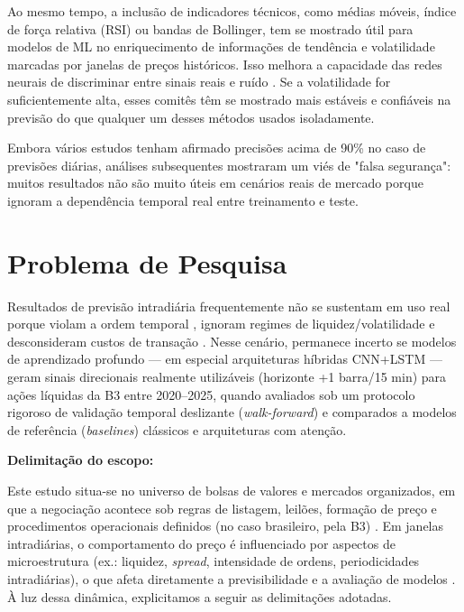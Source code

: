 Ao mesmo tempo, a inclusão de indicadores técnicos, como médias móveis, índice de força relativa (RSI) ou bandas de Bollinger, tem se mostrado útil para modelos de ML no enriquecimento de informações de tendência e volatilidade marcadas por janelas de preços históricos. Isso melhora a capacidade das redes neurais de discriminar entre sinais reais e ruído \cite{ding2020}. Se a volatilidade for suficientemente alta, esses comitês têm se mostrado mais estáveis e confiáveis na previsão do que qualquer um desses métodos usados isoladamente.

Embora vários estudos tenham afirmado precisões acima de 90\% no caso de previsões diárias, análises subsequentes mostraram um viés de "falsa segurança": muitos resultados não são muito úteis em cenários reais de mercado porque ignoram a dependência temporal real entre treinamento e teste.


\section{Problema de Pesquisa}

Resultados de previsão intradiária frequentemente não se sustentam em uso real porque violam a ordem temporal \cite{bergmeir2012,lopezdeprado2018}, ignoram regimes de liquidez/volatilidade \cite{hasbrouck2007empirical,andersen1997intraday,amihud2002illiquidity} e desconsideram custos de transação \cite{lopezdeprado2018,sharpe1994}. Nesse cenário, permanece incerto se modelos de aprendizado profundo — em especial arquiteturas híbridas CNN+LSTM — geram sinais direcionais realmente utilizáveis (horizonte +1 barra/15 min) para ações líquidas da B3 entre 2020–2025, quando avaliados sob um protocolo rigoroso de validação temporal deslizante (\textit{walk-forward}) e comparados a modelos de referência (\textit{baselines}) clássicos e arquiteturas com atenção.

\textbf{Delimitação do escopo:}

Este estudo situa-se no universo de bolsas de valores e mercados organizados, em que a negociação acontece sob regras de listagem, leilões, formação de preço e procedimentos operacionais definidos (no caso brasileiro, pela B3) \cite{b3_manual_negociacao}. Em janelas intradiárias, o comportamento do preço é influenciado por aspectos de microestrutura (ex.: liquidez, \textit{spread}, intensidade de ordens, periodicidades intradiárias), o que afeta diretamente a previsibilidade e a avaliação de modelos \cite{hasbrouck2007empirical,andersen1997intraday,dufour2000time,engle1998acd}. À luz dessa dinâmica, explicitamos a seguir as delimitações adotadas.



